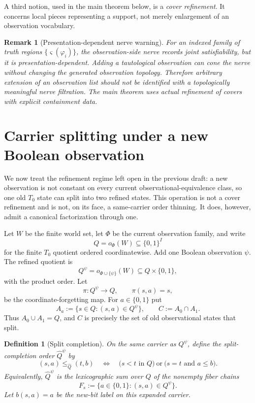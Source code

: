 \documentclass[11pt]{article}
\newtheorem{definition}[theorem]{Definition}
\newtheorem{remark}[theorem]{Remark}
\begin{document}
A third notion, used in the main theorem below, is a \emph{cover refinement}.  It concerns local pieces representing a support, not merely enlargement of an observation vocabulary.

\begin{remark}[Presentation-dependent nerve warning]
For an indexed family of truth regions $\{\varsigma(\varphi_i)\}$, the observation-side nerve records joint satisfiability, but it is presentation-dependent.  Adding a tautological observation can cone the nerve without changing the generated observation topology.  Therefore arbitrary extension of an observation list should not be identified with a topologically meaningful nerve filtration.  The main theorem uses actual refinement of covers with explicit containment data.
\end{remark}

\section{Carrier splitting under a new Boolean observation}\label{sec:carrier-splitting}

We now treat the refinement regime left open in the previous draft: a new
observation is not constant on every current observational-equivalence class, so
one old $T_0$ state can split into two refined states.  This operation is not a
cover refinement and is not, on its face, a same-carrier order thinning.  It does,
however, admit a canonical factorization through one.

Let $W$ be the finite world set, let $\Phi$ be the current observation family,
and write
\[
 Q=o_\Phi(W)\subseteq\{0,1\}^{I}
\]
for the finite $T_0$ quotient ordered coordinatewise.  Add one Boolean
observation $\psi$.  The refined quotient is
\[
 Q^\psi=o_{\Phi\cup\{\psi\}}(W)
 \subseteq Q\times\{0,1\},
\]
with the product order.  Let
\[
 \pi:Q^\psi\longrightarrow Q,
 \qquad \pi(s,a)=s,
\]
be the coordinate-forgetting map.  For $a\in\{0,1\}$ put
\[
 A_a:=\{s\in Q:(s,a)\in Q^\psi\},
 \qquad C:=A_0\cap A_1.
\]
Thus $A_0\cup A_1=Q$, and $C$ is precisely the set of old observational
states that split.

\begin{definition}[Split completion]
On the same carrier as $Q^\psi$, define the split-completion order
$\widehat Q^\psi$ by
\[
 (s,a)\leq_{\widehat Q}(t,b)
 \quad\Longleftrightarrow\quad
 \bigl(s<t\text{ in }Q\bigr)
 \ \text{or}\ 
 \bigl(s=t\text{ and }a\leq b\bigr).
\]
Equivalently, $\widehat Q^\psi$ is the lexicographic sum over $Q$ of the
nonempty fiber chains
\[
 F_s:=\{a\in\{0,1\}:(s,a)\in Q^\psi\}.
\]
Let $b(s,a)=a$ be the new-bit label on this expanded carrier.
\end{definition}
\end{document}
